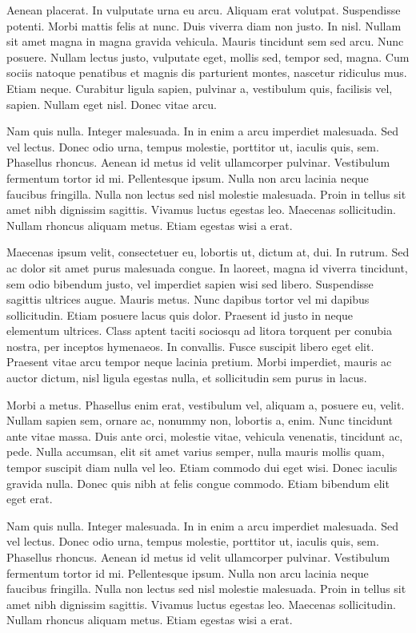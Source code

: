 Aenean placerat. In vulputate urna eu arcu. Aliquam erat volutpat. Suspendisse potenti. Morbi mattis felis at nunc. Duis viverra diam non justo. In nisl. Nullam sit amet magna in magna gravida vehicula. Mauris tincidunt sem sed arcu. Nunc posuere. Nullam lectus justo, vulputate eget, mollis sed, tempor sed, magna. Cum sociis natoque penatibus et magnis dis parturient montes, nascetur ridiculus mus. Etiam neque. Curabitur ligula sapien, pulvinar a, vestibulum quis, facilisis vel, sapien. Nullam eget nisl. Donec vitae arcu.

Nam quis nulla. Integer malesuada. In in enim a arcu imperdiet malesuada. Sed vel lectus. Donec odio urna, tempus molestie, porttitor ut, iaculis quis, sem. Phasellus rhoncus. Aenean id metus id velit ullamcorper pulvinar. Vestibulum fermentum tortor id mi. Pellentesque ipsum. Nulla non arcu lacinia neque faucibus fringilla. Nulla non lectus sed nisl molestie malesuada. Proin in tellus sit amet nibh dignissim sagittis. Vivamus luctus egestas leo. Maecenas sollicitudin. Nullam rhoncus aliquam metus. Etiam egestas wisi a erat.

Maecenas ipsum velit, consectetuer eu, lobortis ut, dictum at, dui. In rutrum. Sed ac dolor sit amet purus malesuada congue. In laoreet, magna id viverra tincidunt, sem odio bibendum justo, vel imperdiet sapien wisi sed libero. Suspendisse sagittis ultrices augue. Mauris metus. Nunc dapibus tortor vel mi dapibus sollicitudin. Etiam posuere lacus quis dolor. Praesent id justo in neque elementum ultrices. Class aptent taciti sociosqu ad litora torquent per conubia nostra, per inceptos hymenaeos. In convallis. Fusce suscipit libero eget elit. Praesent vitae arcu tempor neque lacinia pretium. Morbi imperdiet, mauris ac auctor dictum, nisl ligula egestas nulla, et sollicitudin sem purus in lacus.

Morbi a metus. Phasellus enim erat, vestibulum vel, aliquam a, posuere eu, velit. Nullam sapien sem, ornare ac, nonummy non, lobortis a, enim. Nunc tincidunt ante vitae massa. Duis ante orci, molestie vitae, vehicula venenatis, tincidunt ac, pede. Nulla accumsan, elit sit amet varius semper, nulla mauris mollis quam, tempor suscipit diam nulla vel leo. Etiam commodo dui eget wisi. Donec iaculis gravida nulla. Donec quis nibh at felis congue commodo. Etiam bibendum elit eget erat.

Nam quis nulla. Integer malesuada. In in enim a arcu imperdiet malesuada. Sed vel lectus. Donec odio urna, tempus molestie, porttitor ut, iaculis quis, sem. Phasellus rhoncus. Aenean id metus id velit ullamcorper pulvinar. Vestibulum fermentum tortor id mi. Pellentesque ipsum. Nulla non arcu lacinia neque faucibus fringilla. Nulla non lectus sed nisl molestie malesuada. Proin in tellus sit amet nibh dignissim sagittis. Vivamus luctus egestas leo. Maecenas sollicitudin. Nullam rhoncus aliquam metus. Etiam egestas wisi a erat.

